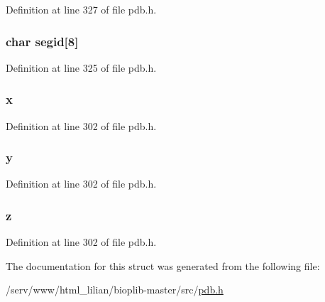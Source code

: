 Definition at line 327 of file pdb.\-h.

\hypertarget{structpdb__entry_ad43d2b0183a7d5531f51b9a30369e805}{
\subsubsection[{segid}]{\setlength{\rightskip}{0pt plus 5cm}char segid\mbox{[}8\mbox{]}}}\label{structpdb__entry_ad43d2b0183a7d5531f51b9a30369e805}


Definition at line 325 of file pdb.\-h.

\hypertarget{structpdb__entry_ad14343030eb6dd7eb6a9c8b4c52fecb0}{
\subsubsection[{x}]{ x}}\label{structpdb__entry_ad14343030eb6dd7eb6a9c8b4c52fecb0}


Definition at line 302 of file pdb.\-h.

\hypertarget{structpdb__entry_a1aa467ce26c2e3301d0b78836e30cab0}{
\subsubsection[{y}]{ y}}\label{structpdb__entry_a1aa467ce26c2e3301d0b78836e30cab0}


Definition at line 302 of file pdb.\-h.

\hypertarget{structpdb__entry_a9195b0e2ec564479b8a02cc3357410b7}{
\subsubsection[{z}]{ z}}\label{structpdb__entry_a9195b0e2ec564479b8a02cc3357410b7}


Definition at line 302 of file pdb.\-h.



The documentation for this struct was generated from the following file\-:\begin{DoxyCompactItemize}
\item 
/serv/www/html\-\_\-lilian/bioplib-\/master/src/\hyperlink{pdb_8h}{pdb.\-h}\end{DoxyCompactItemize}
